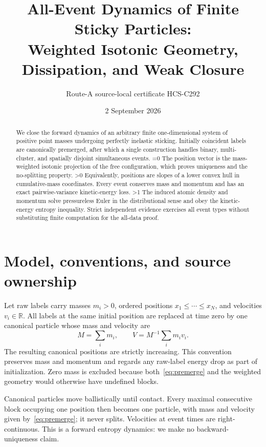 \documentclass[10pt]{article}
\title{All-Event Dynamics of Finite Sticky Particles:\\
Weighted Isotonic Geometry, Dissipation, and Weak Closure}
\author{Route-A source-local certificate HCS-C292}
\date{2 September 2026}
\providecommand{\CRevisionRound}{2}
\newcommand{\R}{\mathbb R}
\begin{document}
\maketitle

\begin{abstract}
We close the forward dynamics of an arbitrary finite one-dimensional system
of positive point masses undergoing perfectly inelastic sticking.
Initially coincident labels are canonically premerged, after which a single
construction handles binary, multi-cluster, and spatially disjoint
simultaneous events.
\ifnum\CRevisionRound=0
The position vector is the mass-weighted isotonic projection of the free
configuration, which proves uniqueness and the no-splitting property.
\fi
\ifnum\CRevisionRound>0
Equivalently, positions are slopes of a lower convex hull in cumulative-mass
coordinates.  Every event conserves mass and momentum and has an exact
pairwise-variance kinetic-energy loss.
\fi
\ifnum\CRevisionRound>1
The induced atomic density and momentum solve pressureless Euler in the
distributional sense and obey the kinetic-energy entropy inequality.
Strict independent evidence exercises all event types without substituting
finite computation for the all-data proof.
\fi
\end{abstract}

\section{Model, conventions, and source ownership}
Let raw labels carry masses $m_i>0$, ordered positions
$x_1\leq\cdots\leq x_N$, and velocities $v_i\in\R$.  All labels at the same
initial position are replaced at time zero by one canonical particle whose
mass and velocity are
\begin{equation}\label{eq:premerge}
 M=\sum_i m_i,
 \qquad V=M^{-1}\sum_i m_i v_i.
\end{equation}
The resulting canonical positions are strictly increasing.  This convention
preserves mass and momentum and regards any raw-label energy drop as part of
initialization.  Zero mass is excluded because both~\eqref{eq:premerge} and
the weighted geometry would otherwise have undefined blocks.

Canonical particles move ballistically until contact.  Every maximal
consecutive block occupying one position then becomes one particle, with
mass and velocity given by~\eqref{eq:premerge}; it never splits.  Velocities
at event times are right-continuous.  This is a forward entropy dynamics:
we make no backward-uniqueness claim.
\end{document}
